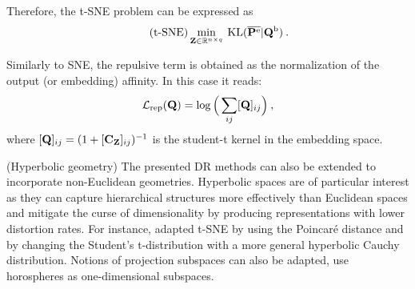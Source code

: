 Therefore, the t-SNE problem can be expressed as
\begin{align}\label{eq:t-SNE_pb}\tag{t-SNE}
    \min_{\mathbf{Z} \in \mathbb{R}^{n \times q}} \: \operatorname{KL}(\overline{{\mathbf{P}}^{\mathrm{e}}} | {\mathbf{Q}}^{\mathrm{b}}) \:.
\end{align}

Similarly to SNE, the repulsive term is obtained as the normalization of the output (or embedding) affinity. In this case it reads:
\begin{align}
    \mathcal{L}_{\mathrm{rep}}({\mathbf{Q}}) = \log \Big(\sum_{ij} [{\mathbf{Q}}]_{ij} \Big) \:,
\end{align}
where $[{\mathbf{Q}}]_{ij} = (1 + [\mathbf{C}_{\mathbf{Z}}]_{ij})^{-1}$ is the student-t kernel in the embedding space.

\begin{remark}{(Hyperbolic geometry)} 
The presented DR methods can also be extended to incorporate non-Euclidean geometries. Hyperbolic spaces \citep{Chami21, Fan_2022_CVPR, Guo22, Lin23} are of particular interest as they can capture hierarchical structures more effectively than Euclidean spaces and mitigate the curse of dimensionality by producing representations with lower distortion rates. 
For instance, \citet{Guo22} adapted t-SNE by using the Poincaré distance and by changing the Student's t-distribution with a more general hyperbolic Cauchy distribution.  Notions of projection subspaces can also be adapted, \eg \citet{Chami21} use horospheres as one-dimensional subspaces. 
\end{remark}

